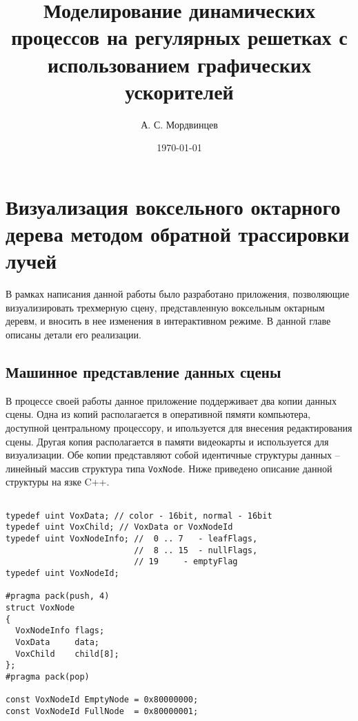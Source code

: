 \documentclass[a4paper,14pt]{extreport}
\begin{document}
\title{Моделирование динамических процессов на регулярных решетках с использованием графических ускорителей}
\author{А. С. Мордвинцев}
\date{\today}


\sloppy  %

\maketitle

\setcounter{page}{3}

\tableofcontents





\chapter{Визуализация воксельного октарного дерева методом обратной трассировки лучей}

В рамках написания данной работы было разработано приложения, позволяющие визуализировать трехмерную сцену, представленную воксельным октарным деревм, и вносить в нее изменения в интерактивном режиме. В данной главе описаны детали его реализации.

\section{Машинное представление данных сцены}

В процессе своей работы данное приложение поддерживает два копии данных сцены. Одна из копий располагается в оперативной пямяти компьютера, доступной центральному процессору, и ипользуется для внесения редактирования сцены. Другая копия располагается в памяти видеокарты и используется для визуализации. Обе копии представляют собой идентичные структуры данных -- линейный массив структура типа \texttt{VoxNode}. Ниже приведено описание данной структуры на язке C++.

\begin{lstlisting}[caption={Структура ноды воксельного дерева}]

typedef uint VoxData; // color - 16bit, normal - 16bit
typedef uint VoxChild; // VoxData or VoxNodeId
typedef uint VoxNodeInfo; //  0 .. 7   - leafFlags, 
                          //  8 .. 15  - nullFlags, 
                          // 19     - emptyFlag
typedef uint VoxNodeId;

#pragma pack(push, 4)  
struct VoxNode
{
  VoxNodeInfo flags;
  VoxData     data;
  VoxChild    child[8];
};
#pragma pack(pop)

const VoxNodeId EmptyNode = 0x80000000;
const VoxNodeId FullNode  = 0x80000001;
\end{lstlisting}
\end{document}
